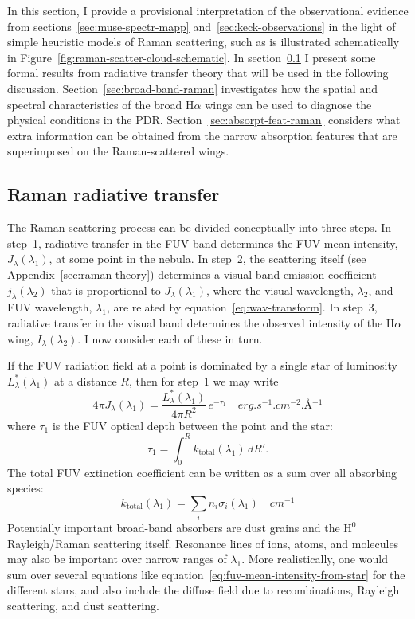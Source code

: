 \documentclass[useAMS, usenatbib, a4paper]{mnras}
\newcommand*\chem[1]{\ensuremath{\mathrm{#1}}}
\newcommand\ha{\ensuremath{\text{H}\alpha}}
\begin{document}
In this section, I provide a provisional interpretation
of the observational evidence
from sections~\ref{sec:muse-spectr-mapp} and~\ref{sec:keck-observations}
in the light of simple heuristic models of Raman scattering,
such as is illustrated schematically in Figure~\ref{fig:raman-scatter-cloud-schematic}.
In section~\ref{sec:raman-radi-transf} I present some formal results
from radiative transfer theory that will be used in the following discussion.
Section~\ref{sec:broad-band-raman} investigates
how the spatial and spectral
characteristics of the broad \ha{} wings can be used to diagnose
the physical conditions in the PDR.\@
Section~\ref{sec:absorpt-feat-raman} considers 
what extra information
can be obtained from the narrow absorption features that are superimposed on the
Raman-scattered wings.

\subsection{Raman radiative transfer}
\label{sec:raman-radi-transf}

The Raman scattering process can be divided conceptually into three steps.
In step~1, radiative transfer in the FUV band determines the FUV mean intensity,
\(J_\lambda(\lambda_1)\), at some point in the nebula.
In step~2, the scattering itself (see Appendix~\ref{sec:raman-theory})
determines a visual-band emission coefficient \(j_\lambda(\lambda_2)\)
that is proportional to \(J_\lambda(\lambda_1)\), where the
visual wavelength, \(\lambda_2\),
and FUV wavelength, \(\lambda_1\),
are related by equation~\eqref{eq:wav-transform}.
In step~3, radiative transfer in the visual band determines the
observed intensity of the \ha{} wing, \(I_\lambda (\lambda_2)\).
I now consider each of these in turn. 

If the FUV radiation field at a point is dominated by a single star
of luminosity \(L_\lambda^*(\lambda_1)\) at a distance \(R\), then for step~1 we may write
\begin{equation}
  \label{eq:fuv-mean-intensity-from-star}
  4\pi J_\lambda(\lambda_1) = \frac{L_\lambda^*(\lambda_1)}{4 \pi R^2} \, e^{-\tau_1}
  \quad \si{erg.s^{-1}.cm^{-2}.\angstrom^{-1}}
\end{equation}
where \(\tau_1\) is the FUV optical depth between the point and the star:
\begin{equation}
  \label{eq:tau-fuv}
  \tau_1 = \int_0^R k_{\text{total}} (\lambda_1) \, dR'.
\end{equation}
The total FUV extinction coefficient can be written as a sum
over all absorbing species:
\begin{equation}
  \label{eq:k-fuv}
  k_{\text{total}} (\lambda_1) = \sum_i n_i \sigma_i(\lambda_1)
  \quad \si{cm^{-1}} 
\end{equation}
Potentially important broad-band absorbers are dust grains
and the \chem{H^0} Rayleigh/Raman scattering itself.
Resonance lines of ions, atoms, and molecules may also be important
over narrow ranges of \(\lambda_1\).
More realistically, one would sum over several equations like equation~\eqref{eq:fuv-mean-intensity-from-star} for the different stars,
and also include the diffuse field due to recombinations, Rayleigh scattering,
and dust scattering.
\end{document}
